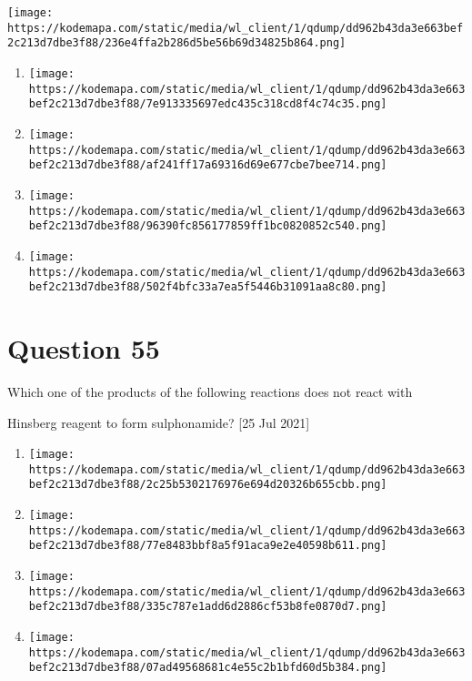 \documentclass{article}
\begin{document}
\texttt{[image: https://kodemapa.com/static/media/wl\_client/1/qdump/dd962b43da3e663bef2c213d7dbe3f88/236e4ffa2b286d5be56b69d34825b864.png]}\\


\begin{enumerate}[label=(\alph*)]
\item \texttt{[image: https://kodemapa.com/static/media/wl\_client/1/qdump/dd962b43da3e663bef2c213d7dbe3f88/7e913335697edc435c318cd8f4c74c35.png]}


\item \texttt{[image: https://kodemapa.com/static/media/wl\_client/1/qdump/dd962b43da3e663bef2c213d7dbe3f88/af241ff17a69316d69e677cbe7bee714.png]}


\item \texttt{[image: https://kodemapa.com/static/media/wl\_client/1/qdump/dd962b43da3e663bef2c213d7dbe3f88/96390fc856177859ff1bc0820852c540.png]}


\item \texttt{[image: https://kodemapa.com/static/media/wl\_client/1/qdump/dd962b43da3e663bef2c213d7dbe3f88/502f4bfc33a7ea5f5446b31091aa8c80.png]}


\end{enumerate}
\newpage
\section*{Question 55}
Which one of the products of the following reactions does not react with

Hinsberg reagent to form sulphonamide? {[}25 Jul 2021{]}


\begin{enumerate}[label=(\alph*)]
\item \texttt{[image: https://kodemapa.com/static/media/wl\_client/1/qdump/dd962b43da3e663bef2c213d7dbe3f88/2c25b5302176976e694d20326b655cbb.png]}


\item \texttt{[image: https://kodemapa.com/static/media/wl\_client/1/qdump/dd962b43da3e663bef2c213d7dbe3f88/77e8483bbf8a5f91aca9e2e40598b611.png]}


\item \texttt{[image: https://kodemapa.com/static/media/wl\_client/1/qdump/dd962b43da3e663bef2c213d7dbe3f88/335c787e1add6d2886cf53b8fe0870d7.png]}


\item \texttt{[image: https://kodemapa.com/static/media/wl\_client/1/qdump/dd962b43da3e663bef2c213d7dbe3f88/07ad49568681c4e55c2b1bfd60d5b384.png]}


\end{enumerate}
\newpage
\end{document}
